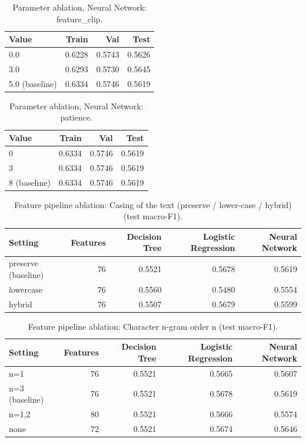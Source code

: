 \begin{table}[ht]
\centering
\small
\caption{Parameter ablation, Neural Network: feature\_clip.}
\label{tab:ablation-neural-feature-clip}
\begin{tabular}{lrrr}
\toprule
Value & Train & Val & Test \\
\midrule
0.0 & 0.6228 & 0.5743 & 0.5626 \\
3.0 & 0.6293 & 0.5730 & 0.5645 \\
5.0 (baseline) & 0.6334 & 0.5746 & 0.5619 \\
\bottomrule
\end{tabular}
\end{table}

\begin{table}[ht]
\centering
\small
\caption{Parameter ablation, Neural Network: patience.}
\label{tab:ablation-neural-patience}
\begin{tabular}{lrrr}
\toprule
Value & Train & Val & Test \\
\midrule
0 & 0.6334 & 0.5746 & 0.5619 \\
3 & 0.6334 & 0.5746 & 0.5619 \\
8 (baseline) & 0.6334 & 0.5746 & 0.5619 \\
\bottomrule
\end{tabular}
\end{table}

\begin{table}[ht]
\centering
\small
\caption{Feature pipeline ablation: Casing of the text (preserve / lower-case / hybrid) (test macro-F1).}
\label{tab:pipeline-casing}
\begin{tabular}{lrrrr}
\toprule
Setting & Features & Decision Tree & Logistic Regression & Neural Network \\
\midrule
preserve (baseline) & 76 & 0.5521 & 0.5678 & 0.5619 \\
lowercase & 76 & 0.5560 & 0.5480 & 0.5554 \\
hybrid & 76 & 0.5507 & 0.5679 & 0.5599 \\
\bottomrule
\end{tabular}
\end{table}

\begin{table}[ht]
\centering
\small
\caption{Feature pipeline ablation: Character n-gram order n (test macro-F1).}
\label{tab:pipeline-char-n}
\begin{tabular}{lrrrr}
\toprule
Setting & Features & Decision Tree & Logistic Regression & Neural Network \\
\midrule
n=1 & 76 & 0.5521 & 0.5665 & 0.5607 \\
n=3 (baseline) & 76 & 0.5521 & 0.5678 & 0.5619 \\
n=1,2 & 80 & 0.5521 & 0.5666 & 0.5574 \\
none & 72 & 0.5521 & 0.5674 & 0.5646 \\
\bottomrule
\end{tabular}
\end{table}

